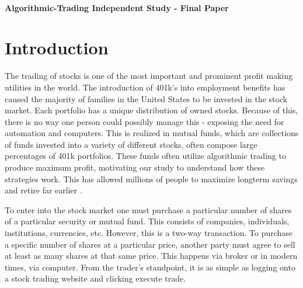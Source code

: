 \documentclass[letterpaper,11pt]{article}
\begin{document}
\thispagestyle{plain}


 \\

\noindent\textbf{Algorithmic-Trading Independent Study - Final Paper}

\section{Introduction}

The trading of stocks is one of the most important and prominent profit making utilities in the world. The introduction of 401k's into employment benefits has caused the majority of families in the United States to be invested in the stock market. Each portfolio has a unique distribution of owned stocks. Because of this, there is no way one person could possibly manage this - exposing the need for automation and computers. This is realized in mutual funds, which are collections of funds invested into a variety of different stocks, often compose large percentages of 401k portfolios. These funds often utilize algorithmic trading to produce maximum profit, motivating our study to understand how these strategies work. This has allowed millions of people to maximize longterm savings and retire far earlier \cite{Treleaven2013}.

To enter into the stock market one must purchase a particular number of shares of a particular security or mutual fund. This consists of companies, individuals, institutions, currencies, etc. However, this is a two-way transaction. To purchase a specific number of shares at a particular price, another party must agree to sell at least as many shares at that same price. This happens via broker or in modern times, via computer. From the trader's standpoint, it is as simple as logging onto a stock trading website and clicking execute trade. 
\end{document}

